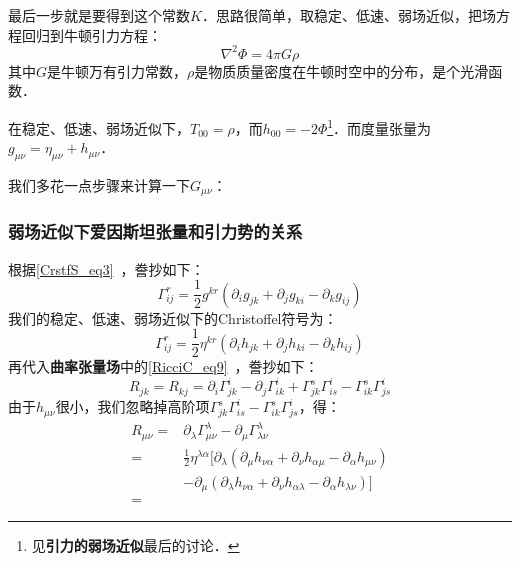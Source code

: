 最后一步就是要得到这个常数$K$．思路很简单，取稳定、低速、弱场近似，把场方程回归到牛顿引力方程：
\begin{equation}
\nabla^2\Phi=4\pi G\rho
\end{equation}
其中$G$是牛顿万有引力常数，$\rho$是物质质量密度在牛顿时空中的分布，是个光滑函数．


在稳定、低速、弱场近似下，$T_{00}=\rho$，而$h_{00}=-2\Phi$\footnote{见\textbf{引力的弱场近似}最后的讨论．}．而度量张量为$g_{\mu\nu}=\eta_{\mu\nu}+h_{\mu\nu}$．


我们多花一点步骤来计算一下$G_{\mu\nu}$：


\subsubsection{弱场近似下爱因斯坦张量和引力势的关系}



根据\autoref{CrstfS_eq3}~，誊抄如下：
\begin{equation}
\Gamma^{r}_{ij}=\frac{1}{2}g^{kr}(\partial_ig_{jk}+\partial_jg_{ki}-\partial_kg_{ij})
\end{equation}
我们的稳定、低速、弱场近似下的Christoffel符号为：
\begin{equation}
\Gamma^{r}_{ij}=\frac{1}{2}\eta^{kr}(\partial_ih_{jk}+\partial_jh_{ki}-\partial_kh_{ij})
\end{equation}
再代入\textbf{曲率张量场}中的\autoref{RicciC_eq9}~，誊抄如下：
\begin{equation}
R_{jk}=R_{kj}=\partial_i\Gamma^i_{jk}-\partial_j\Gamma^{i}_{ik}+\Gamma^s_{jk}\Gamma^i_{is}-\Gamma^s_{ik}\Gamma^i_{js}
\end{equation}
由于$h_{\mu\nu}$很小，我们忽略掉高阶项$\Gamma^s_{jk}\Gamma^i_{is}-\Gamma^s_{ik}\Gamma^i_{js}$，得：
\begin{equation}
\begin{aligned}
R_{\mu\nu}=&\partial_\lambda\Gamma^\lambda_{\mu\nu}-\partial_{\mu}\Gamma^\lambda_{\lambda\nu}\\
=&\frac{1}{2}\eta^{\lambda\alpha}[\partial_\lambda(\partial_\mu h_{\nu \alpha}+\partial_\nu h_{\alpha\mu}-\partial_\alpha h_{\mu\nu})\\
&-\partial_\mu(\partial_\lambda h_{\nu\alpha}+\partial_\nu h_{\alpha\lambda}-\partial_\alpha h_{\lambda\nu})]\\
=&
\end{aligned}
\end{equation}








